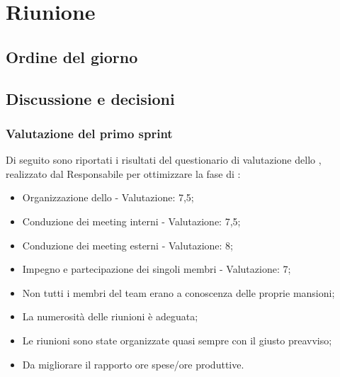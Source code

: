 \section{Riunione}
\subsection{Ordine del giorno}

\subsection{Discussione e decisioni}

\subsubsection{Valutazione del primo sprint}
\par Di seguito sono riportati i risultati del questionario di valutazione dello , realizzato dal Responsabile per ottimizzare la fase di :
\begin{itemize}
  \item Organizzazione dello  - Valutazione: 7,5;
  \item Conduzione dei meeting interni - Valutazione: 7,5;
  \item Conduzione dei meeting esterni - Valutazione: 8;
  \item Impegno e partecipazione dei singoli membri - Valutazione: 7;
  \item Non tutti i membri del team erano a conoscenza delle proprie mansioni;
  \item La numerosità delle riunioni è adeguata;
  \item Le riunioni sono state organizzate quasi sempre con il giusto preavviso;
  \item Da migliorare il rapporto ore spese/ore produttive.
\end{itemize}

